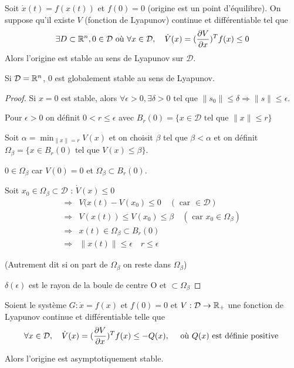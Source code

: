 \documentclass[main.tex]{subfiles} \newcommand{\D}{\mathcal{D}}
\begin{document}
\begin{thm} Soit $\dot{x}(t) = f(x(t))$ et
	$f(0)=0$ (origine est un point d'équilibre). On suppose qu'il existe $V$
	(fonction de Lyapunov) continue et différentiable tel que \[ \exists D
	\subset \R^n, 0 \in \D \text{ où } \forall x \in \D, \quad \dot{V}(x) =
	(\derivp[V]{x})^Tf(x) \leq 0 \] Alors l'origine est stable au sens de
	Lyapunov sur $\D$.

  Si $\D = \R^n$, 0 est globalement stable au sens de Lyapunov.  \end{thm}

\begin{proof} Si $x=0$ est stable, alors $\forall \epsilon > 0, \exists \delta
	> 0 \text{ tel que } \|s_0\| \leq \delta \Rightarrow \|s\| \leq \epsilon$.

  Pour $\epsilon > 0$ on définit $0<r\leq \epsilon$ avec $B_r(0) = \{ x \in \D
	\text{ tel que } \|x\| \leq r \}$

  Soit $\alpha = \min_{\|x\| = r} V(x)$ et on choisit $\beta$ tel que $\beta <
	\alpha$ et on définit $\Omega_{\beta} = \{ x \in B_r(0) \text{ tel que }
	V(x) \leq \beta \}$.

  $0\in \Omega_{\beta}$ car $V(0) = 0$ et $\Omega_{\beta} \subset B_r(0)$.

  Soit $x_0\in \Omega_{\beta} \subset \D$ : $\dot{V}(x) \leq 0$ \begin{align*}
	  \Rightarrow & V(x(t)-V(x_0) \leq 0 \quad (\text{ car } \in \D) \\
	  \Rightarrow & V(x(t)) \leq V(x_0) \leq \beta \quad (\text{ car } x_0 \in
	  \Omega_{\beta}) \\ \Rightarrow & x(t) \in \Omega_{\beta} \subset B_r(0)\\
  \Rightarrow & \|x(t)\| \leq \epsilon \quad r \leq \epsilon \end{align*}

  (Autrement dit si on part de $\Omega_{\beta}$ on reste dans $\Omega_{\beta}$)

  $\delta(\epsilon)$ est le rayon de la boule de centre O et $\subset
\Omega_{\beta}$ \end{proof}

\begin{thm} Soient le système
	$G:\dot{x}=f(x)$ et $f(0)=0$ et $V:\D \rightarrow\R_+$ une fonction de
	Lyapunov continue et différentiable telle que \[ \forall x \in \D, \quad
	\dot{V}(x) = (\derivp[V]{x})^T f(x) \leq -Q(x), \quad \text{ où } Q(x)
	\text{ est définie positive } \]

  Alors l'origine est asymptotiquement stable.  \end{thm}
\end{document}

